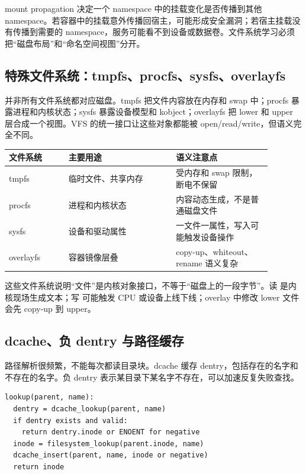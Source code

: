 mount propagation 决定一个 namespace 中的挂载变化是否传播到其他 namespace。若容器中的挂载意外传播回宿主，可能形成安全漏洞；若宿主挂载没有传播到需要的 namespace，服务可能看不到设备或数据卷。文件系统学习必须把“磁盘布局”和“命名空间视图”分开。

\subsection{特殊文件系统：tmpfs、procfs、sysfs、overlayfs}

并非所有文件系统都对应磁盘。tmpfs 把文件内容放在内存和 swap 中；procfs 暴露进程和内核状态；sysfs 暴露设备模型和 kobject；overlayfs 把 lower 和 upper 层合成一个视图。VFS 的统一接口让这些对象都能被 open/read/write，但语义完全不同。

\begin{longtable}{p{0.2\linewidth}p{0.36\linewidth}p{0.32\linewidth}}
\toprule
文件系统 & 主要用途 & 语义注意点 \\
\midrule
tmpfs & 临时文件、共享内存 & 受内存和 swap 限制，断电不保留 \\
procfs & 进程和内核状态 & 内容动态生成，不是普通磁盘文件 \\
sysfs & 设备和驱动属性 & 一文件一属性，写入可能触发设备操作 \\
overlayfs & 容器镜像层叠 & copy-up、whiteout、rename 语义复杂 \\
\bottomrule
\end{longtable}

这些文件系统说明“文件”是内核对象接口，不等于“磁盘上的一段字节”。读  是内核现场生成文本；写  可能触发 CPU 或设备上线下线；overlay 中修改 lower 文件会先 copy-up 到 upper。

\subsection{dcache、负 dentry 与路径缓存}

路径解析很频繁，不能每次都读目录块。dcache 缓存 dentry，包括存在的名字和不存在的名字。负 dentry 表示某目录下某名字不存在，可以加速反复失败查找。

\begin{lstlisting}
lookup(parent, name):
  dentry = dcache_lookup(parent, name)
  if dentry exists and valid:
    return dentry.inode or ENOENT for negative
  inode = filesystem_lookup(parent.inode, name)
  dcache_insert(parent, name, inode or negative)
  return inode
\end{lstlisting}

